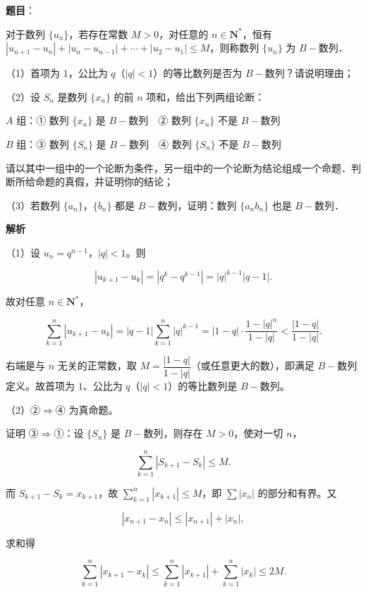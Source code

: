 \begin{answer}

\textbf{题目}：

对于数列 $\{u_n\}$，若存在常数 $M>0$，对任意的 $n\in\mathbf N^*$，恒有 $|u_{n+1}-u_n|+|u_n-u_{n-1}|+\cdots+|u_2-u_1|\leqslant M$，则称数列 $\{u_n\}$ 为 $B-$数列．

（1）首项为 $1$，公比为 $q$（$|q|<1$）的等比数列是否为 $B-$数列？请说明理由；

（2）设 $S_n$ 是数列 $\{x_n\}$ 的前 $n$ 项和，给出下列两组论断：

$A$ 组：① 数列 $\{x_n\}$ 是 $B-$数列　② 数列 $\{x_n\}$ 不是 $B-$数列

$B$ 组：③ 数列 $\{S_n\}$ 是 $B-$数列　④ 数列 $\{S_n\}$ 不是 $B-$数列

请以其中一组中的一个论断为条件，另一组中的一个论断为结论组成一个命题．判断所给命题的真假，并证明你的结论；

（3）若数列 $\{a_n\}$，$\{b_n\}$ 都是 $B-$数列，证明：数列 $\{a_nb_n\}$ 也是 $B-$数列．

\textbf{解析}

（1）设 $u_n=q^{n-1}$，$|q|<1$。则

\nopagebreak[4]
\[|u_{k+1}-u_k|=|q^k-q^{k-1}|=|q|^{k-1}|q-1|.\]

故对任意 $n\in\mathbf N^*$，

\nopagebreak[4]
\[\sum_{k=1}^n|u_{k+1}-u_k|
=|q-1|\sum_{k=1}^n|q|^{k-1}
=|1-q|\cdot\frac{1-|q|^n}{1-|q|}
<\frac{|1-q|}{1-|q|}.\]

右端是与 $n$ 无关的正常数，取 $M=\dfrac{|1-q|}{1-|q|}$（或任意更大的数），即满足 $B-$数列定义。故首项为 $1$、公比为 $q$（$|q|<1$）的等比数列是 $B-$数列。

（2）②$\Rightarrow$④ 为真命题。

证明 ③$\Rightarrow$①：设 $\{S_n\}$ 是 $B-$数列，则存在 $M>0$，使对一切 $n$，

\nopagebreak[4]
\[\sum_{k=1}^n|S_{k+1}-S_k|\leqslant M.\]

而 $S_{k+1}-S_k=x_{k+1}$，故 $\sum\limits_{k=1}^n|x_{k+1}|\leqslant M$，即 $\sum|x_n|$ 的部分和有界。又

\nopagebreak[4]
\[|x_{n+1}-x_n|\leqslant|x_{n+1}|+|x_n|,\]

求和得

\nopagebreak[4]
\[\sum_{k=1}^n|x_{k+1}-x_k|
\leqslant\sum_{k=1}^n|x_{k+1}|+\sum_{k=1}^n|x_k|
\leqslant2M.\]


\end{answer}
